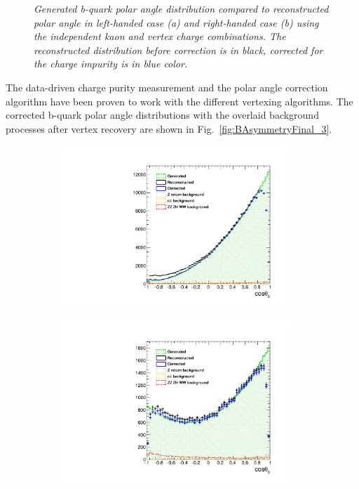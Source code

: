 \begin{figure}
\begin{subfigure}{0.5\textwidth}
		\caption{\label{fig:BAsymmetryCorrected_b_3} }
	\end{subfigure}
	\caption{\sl Generated b-quark polar angle distribution compared to reconstructed polar angle in left-handed case (a) and right-handed case (b) using the independent kaon and vertex charge combinations. The reconstructed distribution before correction is in black, corrected for the charge impurity is in blue color. }
	\label{fig:BAsymmetryCorrected_3}
\end{figure}

The data-driven charge purity measurement and the polar angle correction algorithm have been proven to work with the different vertexing algorithms. 
The corrected b-quark polar angle distributions with the overlaid background processes after vertex recovery are shown in Fig.~\ref{fig:BAsymmetryFinal_3}.
\begin{figure}
	\centering
	\begin{subfigure}{0.5\textwidth}
		\includegraphics[width=0.95\textwidth]{ILD/plots/basymmetry-final-left.pdf}
		\caption{\label{fig:BAsymmetryFinal_a_3} }
	\end{subfigure}%
	\begin{subfigure}{0.5\textwidth}
		\centering
		\includegraphics[width=0.95\textwidth]{ILD/plots/basymmetry-final-right.pdf}

\end{subfigure}
\end{figure}
